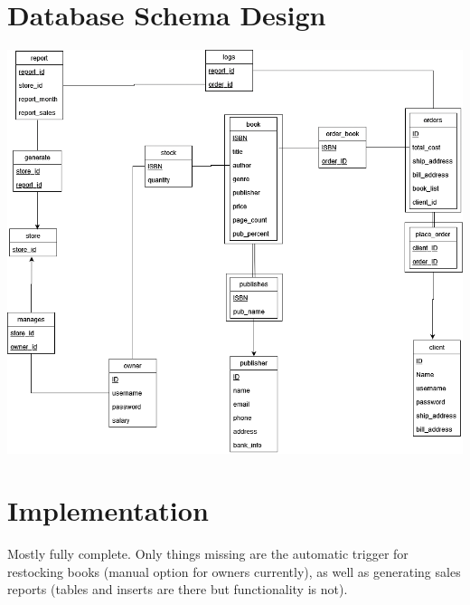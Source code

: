 \documentclass[Project Report]{article}
\begin{document}
\newpage
\section{Database Schema Design}
{\centering \includegraphics[width=\textwidth]{Schema_Diagram.png}}

\section{Implementation}
Mostly fully complete. Only things missing are the automatic trigger for restocking books (manual option for owners currently), as well as generating sales reports (tables and inserts are there but functionality is not).\\\\\\\\\\\\\\\\\\\\
\end{document}
